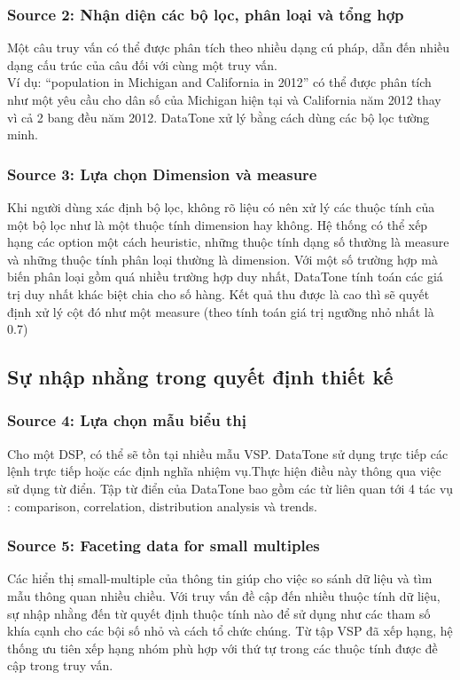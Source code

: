 \documentclass[12pt]{report}
\begin{document}
\subsubsection*{Source 2: Nhận diện các bộ lọc, phân loại và tổng hợp}
Một câu truy vấn có thể được phân tích theo nhiều dạng cú pháp, dẫn đến nhiều dạng cấu trúc của câu đối với cùng một truy vấn.
\\
Ví dụ: “population in Michigan and California in 2012” có thể được phân tích như một yêu cầu cho dân số của Michigan hiện tại và California năm 2012  thay vì cả 2 bang đều năm 2012. DataTone xử lý bằng cách dùng các bộ lọc tường minh.
\subsubsection*{Source 3: Lựa chọn Dimension và measure} 
Khi người dùng xác định bộ lọc, không rõ liệu có nên xử lý các thuộc tính của một bộ lọc như là một thuộc tính dimension hay không. Hệ thống có thể xếp hạng các option một cách heuristic, những thuộc tính dạng số thường là measure và những thuộc tính phân loại thường là dimension. Với một số trường hợp mà biến phân loại gồm quá nhiều trường hợp duy nhất, DataTone tính toán các giá trị duy nhất khác biệt chia cho số hàng. Kết quả thu được là cao thì sẽ quyết định xử lý cột đó như một measure (theo tính toán giá trị ngưỡng nhỏ nhất là 0.7)
\subsection{Sự nhập nhằng trong quyết định thiết kế}
\subsubsection*{Source 4: Lựa chọn mẫu biểu thị}
Cho một DSP, có thể sẽ tồn tại nhiều mẫu VSP. DataTone sử dụng trực tiếp các lệnh trực tiếp hoặc các định nghĩa nhiệm vụ.Thực hiện điều này thông qua việc sử dụng từ điển. Tập từ điển của DataTone bao gồm các từ liên quan tới 4 tác vụ : comparison, correlation, distribution analysis và trends. 
\subsubsection*{Source 5: Faceting data for small multiples} 
Các hiển thị small-multiple của thông tin giúp cho việc so sánh dữ liệu và tìm mẫu thông quan nhiều chiều. Với truy vấn đề cập đến nhiều thuộc tính dữ liệu, sự nhập nhằng đến từ quyết định thuộc tính nào để sử dụng như các tham số khía cạnh cho các bội số nhỏ và cách tổ chức chúng. Từ tập VSP đã xếp hạng, hệ thống ưu tiên  xếp hạng nhóm phù hợp với thứ tự trong các thuộc tính được đề cập trong truy vấn. 
\end{document}
